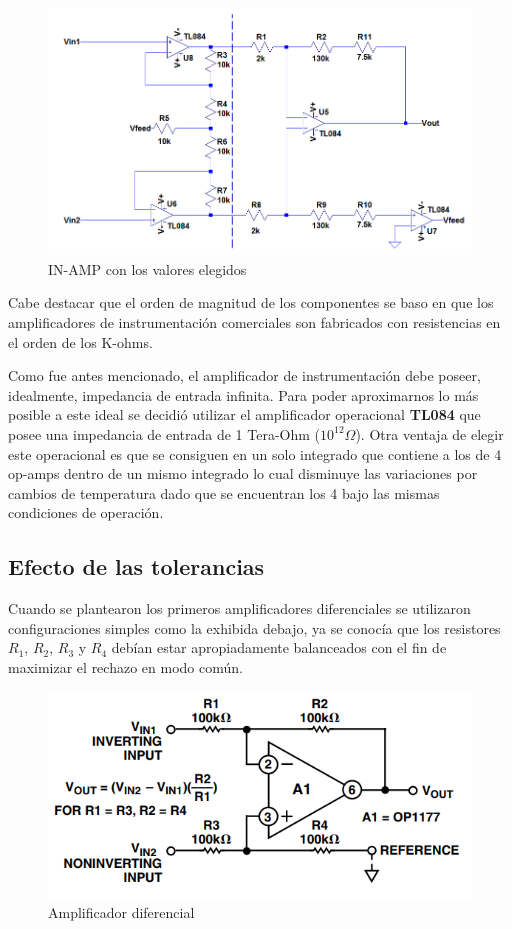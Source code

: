 \begin{figure}[H]
	\centering
	\includegraphics[width=\linewidth]{./ImagenesVarias/IN-AMP-CON-VALORES.png}
	\caption{IN-AMP con los valores elegidos}
\end{figure}

  Cabe destacar que el orden de magnitud de los componentes se baso en que los amplificadores de instrumentación comerciales son fabricados con resistencias en el orden de los K-ohms.
  
  Como fue antes mencionado, el amplificador de instrumentación debe poseer, idealmente, impedancia de entrada infinita. Para poder aproximarnos lo más posible a este ideal se decidió utilizar el amplificador operacional \textbf{TL084} que posee una impedancia de entrada de 1 Tera-Ohm ($10^{12}\Omega$). Otra ventaja de elegir este operacional es que se consiguen en un solo integrado que contiene a los de 4 op-amps dentro de un mismo integrado lo cual disminuye las variaciones por cambios de temperatura dado que se encuentran los 4 bajo las mismas condiciones de operación.
  
\subsection{Efecto de las tolerancias}
Cuando se plantearon los primeros amplificadores diferenciales se utilizaron configuraciones simples como la exhibida debajo, ya se conocía que los resistores $R_1$, $R_2$, $R_3$ y $R_4$ debían estar apropiadamente balanceados con el fin de maximizar el rechazo en modo común. 
\begin{figure}[H]
	\centering
	\includegraphics[width=\linewidth]{./ImagenesVarias/AmplificadorDiferencial.PNG}
	\caption{Amplificador diferencial}
\end{figure}  

